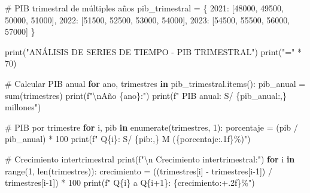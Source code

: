 \documentclass[
  doc,
  floatsintext,
  longtable,
  a4paper,
  nolmodern,
  notxfonts,
  notimes,
  12pt,
  colorlinks=true,linkcolor=blue,citecolor=blue,urlcolor=blue]{apa7}
\newenvironment{Shaded}{\begin{snugshade}}{\end{snugshade}}
\newcommand{\BuiltInTok}[1]{\textcolor[rgb]{0.00,0.23,0.31}{#1}}
\newcommand{\CharTok}[1]{\textcolor[rgb]{0.13,0.47,0.30}{#1}}
\newcommand{\CommentTok}[1]{\textcolor[rgb]{0.37,0.37,0.37}{#1}}
\newcommand{\ControlFlowTok}[1]{\textcolor[rgb]{0.00,0.23,0.31}{\textbf{#1}}}
\newcommand{\DecValTok}[1]{\textcolor[rgb]{0.68,0.00,0.00}{#1}}
\newcommand{\KeywordTok}[1]{\textcolor[rgb]{0.00,0.23,0.31}{\textbf{#1}}}
\newcommand{\NormalTok}[1]{\textcolor[rgb]{0.00,0.23,0.31}{#1}}
\newcommand{\OperatorTok}[1]{\textcolor[rgb]{0.37,0.37,0.37}{#1}}
\newcommand{\SpecialCharTok}[1]{\textcolor[rgb]{0.37,0.37,0.37}{#1}}
\newcommand{\SpecialStringTok}[1]{\textcolor[rgb]{0.13,0.47,0.30}{#1}}
\newcommand{\StringTok}[1]{\textcolor[rgb]{0.13,0.47,0.30}{#1}}
\begin{document}
\begin{Shaded}
\begin{Highlighting}[]
\CommentTok{\# PIB trimestral de múltiples años}
\NormalTok{pib\_trimestral }\OperatorTok{=}\NormalTok{ \{}
    \DecValTok{2021}\NormalTok{: [}\DecValTok{48000}\NormalTok{, }\DecValTok{49500}\NormalTok{, }\DecValTok{50000}\NormalTok{, }\DecValTok{51000}\NormalTok{],}
    \DecValTok{2022}\NormalTok{: [}\DecValTok{51500}\NormalTok{, }\DecValTok{52500}\NormalTok{, }\DecValTok{53000}\NormalTok{, }\DecValTok{54000}\NormalTok{],}
    \DecValTok{2023}\NormalTok{: [}\DecValTok{54500}\NormalTok{, }\DecValTok{55500}\NormalTok{, }\DecValTok{56000}\NormalTok{, }\DecValTok{57000}\NormalTok{]}
\NormalTok{\}}

\BuiltInTok{print}\NormalTok{(}\StringTok{"ANÁLISIS DE SERIES DE TIEMPO {-} PIB TRIMESTRAL"}\NormalTok{)}
\BuiltInTok{print}\NormalTok{(}\StringTok{"="} \OperatorTok{*} \DecValTok{70}\NormalTok{)}

\CommentTok{\# Calcular PIB anual}
\ControlFlowTok{for}\NormalTok{ ano, trimestres }\KeywordTok{in}\NormalTok{ pib\_trimestral.items():}
\NormalTok{    pib\_anual }\OperatorTok{=} \BuiltInTok{sum}\NormalTok{(trimestres)}
    \BuiltInTok{print}\NormalTok{(}\SpecialStringTok{f"}\CharTok{\textbackslash{}n}\SpecialStringTok{Año }\SpecialCharTok{\{}\NormalTok{ano}\SpecialCharTok{\}}\SpecialStringTok{:"}\NormalTok{)}
    \BuiltInTok{print}\NormalTok{(}\SpecialStringTok{f"  PIB anual: S/ }\SpecialCharTok{\{}\NormalTok{pib\_anual}\SpecialCharTok{:,\}}\SpecialStringTok{ millones"}\NormalTok{)}
    
    \CommentTok{\# PIB por trimestre}
    \ControlFlowTok{for}\NormalTok{ i, pib }\KeywordTok{in} \BuiltInTok{enumerate}\NormalTok{(trimestres, }\DecValTok{1}\NormalTok{):}
\NormalTok{        porcentaje }\OperatorTok{=}\NormalTok{ (pib }\OperatorTok{/}\NormalTok{ pib\_anual) }\OperatorTok{*} \DecValTok{100}
        \BuiltInTok{print}\NormalTok{(}\SpecialStringTok{f"  Q}\SpecialCharTok{\{}\NormalTok{i}\SpecialCharTok{\}}\SpecialStringTok{: S/ }\SpecialCharTok{\{}\NormalTok{pib}\SpecialCharTok{:,\}}\SpecialStringTok{ M (}\SpecialCharTok{\{}\NormalTok{porcentaje}\SpecialCharTok{:.1f\}}\SpecialStringTok{\%)"}\NormalTok{)}
    
    \CommentTok{\# Crecimiento intertrimestral}
    \BuiltInTok{print}\NormalTok{(}\SpecialStringTok{f"}\CharTok{\textbackslash{}n}\SpecialStringTok{  Crecimiento intertrimestral:"}\NormalTok{)}
    \ControlFlowTok{for}\NormalTok{ i }\KeywordTok{in} \BuiltInTok{range}\NormalTok{(}\DecValTok{1}\NormalTok{, }\BuiltInTok{len}\NormalTok{(trimestres)):}
\NormalTok{        crecimiento }\OperatorTok{=}\NormalTok{ ((trimestres[i] }\OperatorTok{{-}}\NormalTok{ trimestres[i}\OperatorTok{{-}}\DecValTok{1}\NormalTok{]) }\OperatorTok{/}\NormalTok{ trimestres[i}\OperatorTok{{-}}\DecValTok{1}\NormalTok{]) }\OperatorTok{*} \DecValTok{100}
        \BuiltInTok{print}\NormalTok{(}\SpecialStringTok{f"    Q}\SpecialCharTok{\{}\NormalTok{i}\SpecialCharTok{\}}\SpecialStringTok{ a Q}\SpecialCharTok{\{}\NormalTok{i}\OperatorTok{+}\DecValTok{1}\SpecialCharTok{\}}\SpecialStringTok{: }\SpecialCharTok{\{}\NormalTok{crecimiento}\SpecialCharTok{:+.2f\}}\SpecialStringTok{\%"}\NormalTok{)}


\end{Highlighting}
\end{Shaded}
\end{document}
